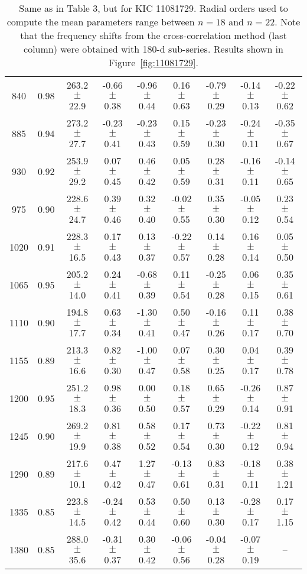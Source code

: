 \documentclass[twocolumn]{aastex61}%
\begin{document}
\begin{table*}[ht]
\begin{tabular}{ccc|ccccc|c}
840 & 0.98 & 263.2 $\pm$ 22.9 & -0.66 $\pm$ 0.38 & -0.96 $\pm$ 0.44 & 0.16 $\pm$ 0.63 & -0.79 $\pm$ 0.29 & -0.14 $\pm$ 0.13 & -0.22 $\pm$ 0.62\\
885 & 0.94 & 273.2 $\pm$ 27.7 & -0.23 $\pm$ 0.41 & -0.23 $\pm$ 0.43 & 0.15 $\pm$ 0.59 & -0.23 $\pm$ 0.30 & -0.24 $\pm$ 0.11 & -0.35 $\pm$ 0.67\\
930 & 0.92 & 253.9 $\pm$ 29.2 & 0.07 $\pm$ 0.45 & 0.46 $\pm$ 0.42 & 0.05 $\pm$ 0.59 & 0.28 $\pm$ 0.31 & -0.16 $\pm$ 0.11 & -0.14 $\pm$ 0.65\\
975 & 0.90 & 228.6 $\pm$ 24.7 & 0.39 $\pm$ 0.46 & 0.32 $\pm$ 0.40 & -0.02 $\pm$ 0.55 & 0.35 $\pm$ 0.30 & -0.05 $\pm$ 0.12 & 0.23 $\pm$ 0.54\\
1020 & 0.91 & 228.3 $\pm$ 16.5 & 0.17 $\pm$ 0.43 & 0.13 $\pm$ 0.37 & -0.22 $\pm$ 0.57 & 0.14 $\pm$ 0.28 & 0.16 $\pm$ 0.14 & 0.05 $\pm$ 0.50\\
1065 & 0.95 & 205.2 $\pm$ 14.0 & 0.24 $\pm$ 0.41 & -0.68 $\pm$ 0.39 & 0.11 $\pm$ 0.54 & -0.25 $\pm$ 0.28 & 0.06 $\pm$ 0.15 & 0.35 $\pm$ 0.61\\
1110 & 0.90 & 194.8 $\pm$ 17.7 & 0.63 $\pm$ 0.34 & -1.30 $\pm$ 0.41 & 0.50 $\pm$ 0.47 & -0.16 $\pm$ 0.26 & 0.11 $\pm$ 0.17 & 0.38 $\pm$ 0.70\\
1155 & 0.89 & 213.3 $\pm$ 16.6 & 0.82 $\pm$ 0.30 & -1.00 $\pm$ 0.47 & 0.07 $\pm$ 0.58 & 0.30 $\pm$ 0.25 & 0.04 $\pm$ 0.17 & 0.39 $\pm$ 0.78\\
1200 & 0.95 & 251.2 $\pm$ 18.3 & 0.98 $\pm$ 0.36 & 0.00 $\pm$ 0.50 & 0.18 $\pm$ 0.57 & 0.65 $\pm$ 0.29 & -0.26 $\pm$ 0.14 & 0.87 $\pm$ 0.91\\
1245 & 0.90 & 269.2 $\pm$ 19.9 & 0.81 $\pm$ 0.38 & 0.58 $\pm$ 0.52 & 0.17 $\pm$ 0.54 & 0.73 $\pm$ 0.30 & -0.22 $\pm$ 0.12 & 0.81 $\pm$ 0.94\\
1290 & 0.89 & 217.6 $\pm$ 10.1 & 0.47 $\pm$ 0.42 & 1.27 $\pm$ 0.47 & -0.13 $\pm$ 0.61 & 0.83 $\pm$ 0.31 & -0.18 $\pm$ 0.11 & 0.38 $\pm$ 1.21\\
1335 & 0.85 & 223.8 $\pm$ 14.5 & -0.24 $\pm$ 0.42 & 0.53 $\pm$ 0.44 & 0.50 $\pm$ 0.60 & 0.13 $\pm$ 0.30 & -0.28 $\pm$ 0.17 & 0.17 $\pm$ 1.15\\
1380 & 0.85 & 288.0 $\pm$ 35.6 & -0.31 $\pm$ 0.37 & 0.30 $\pm$ 0.42 & -0.06 $\pm$ 0.56 & -0.04 $\pm$ 0.28 & -0.07 $\pm$ 0.19 & --\\
\end{tabular}
\caption{Same as in Table 3, but for KIC 11081729. {Radial orders used to compute the mean parameters range between $n=18$ and $n=22$.} Note that the frequency shifts from the cross-correlation method (last column) were obtained with 180-d sub-series. Results shown in Figure~\ref{fig:11081729}.}\label{tab:11081729}
\end{table*}
\end{document}
